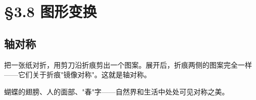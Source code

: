 \chapter{§3.8 图形变换}
\label{sec:3.8}





\section*{轴对称}


\begin{explore}


把一张纸对折，用剪刀沿折痕剪出一个图案。展开后，折痕两侧的图案完全一样——它们关于折痕"镜像对称"。这就是轴对称。

蝴蝶的翅膀、人的面部、"春"字——自然界和生活中处处可见对称之美。

\end{explore}

